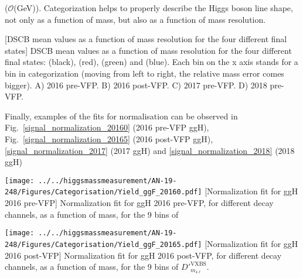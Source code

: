 ($\mathcal{O}$({GeV})).
Categorization  helps to properly describe the Higgs boson line shape, not only as a function of mass, but also as a function of mass resolution.
\begin{multiFigure}
    \centering
        [DSCB mean values as a function of mass resolution for the four different final states]
        {DSCB mean values as a function of mass resolution for the four different final states: \fourmu (black),
        \foure (red), \twoetwomu (green) and \twomutwoe (blue). Each bin on the x axis stands for a bin 
        in categorization (moving from left to right, the relative mass error comes bigger). 
        \;A) 2016 pre-VFP.
        \;B) 2016 post-VFP.
        \;C) 2017 pre-VFP.
        \;D) 2018 pre-VFP.}
    \label{MeanDependence}
\end{multiFigure}
Finally, examples of the fits for normalisation can be observed in 
Fig.~\ref{signal_normalization_20160} (2016 pre-VFP ggH),
Fig.~\ref{signal_normalization_20165} (2016 post-VFP ggH), 
\ref{signal_normalization_2017} (2017 ggH) and 
\ref{signal_normalization_2018} (2018 ggH)
\begin{multiFigure}
    \centering
        \texttt{[image: ../../higgsmassmeasurement/AN-19-248/Figures/Categorisation/Yield\_ggF\_20160.pdf]}
        [Normalization fit for ggH 2016 pre-VFP]
        {Normalization fit for ggH 2016 pre-VFP, for different decay channels, as a function of mass, for the 9 bins of
        }
    \label{signal_normalization_20160}
\end{multiFigure}
\begin{multiFigure}
    \centering
        \texttt{[image: ../../higgsmassmeasurement/AN-19-248/Figures/Categorisation/Yield\_ggF\_20165.pdf]}
        [Normalization fit for ggH 2016 post-VFP]
        {Normalization fit for ggH 2016 post-VFP, for different decay channels, as a function of mass, for the 9 bins of $D'^{\text{VXBS}}_{m_{4\ell}}$.}
    \label{signal_normalization_20165}
\end{multiFigure}
